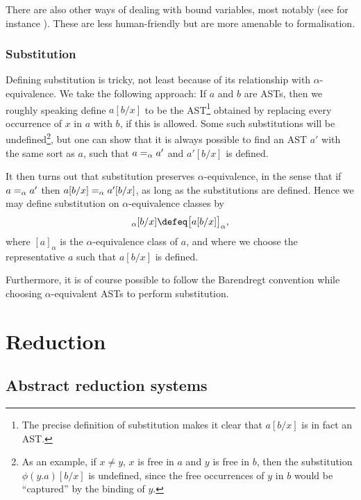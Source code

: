 There are also other ways of dealing with bound variables, most notably  (see for instance \cite[Appendix~C]{barendregt-lambda}). These are less human-friendly but are more amenable to formalisation.


\subsubsection{Substitution}

Defining substitution is tricky, not least because of its relationship with $\alpha$-equivalence. We take the following approach: If $a$ and $b$ are ASTs, then we roughly speaking define $a[b/x]$ to be the AST\footnote{The precise definition of substitution makes it clear that $a[b/x]$ is in fact an AST.} obtained by replacing every occurrence of $x$ in $a$ with $b$, if this is allowed. Some such substitutions will be undefined\footnote{As an example, if $x \neq y$, $x$ is free in $a$ and $y$ is free in $b$, then the substitution $\phi(y.a)[b/x]$ is undefined, since the free occurrences of $y$ in $b$ would be \enquote{captured} by the binding of $y$.}, but one can show that it is always possible to find an AST $a'$ with the same sort as $a$, such that $a =_\alpha a'$ and $a'[b/x]$ is defined.

It then turns out that substitution preserves $\alpha$-equivalence, in the sense that if $a =_\alpha a'$ then $a[b/x] =_\alpha a'[b/x]$, as long as the substitutions are defined. Hence we may define substitution on $\alpha$-equivalence classes by
%
\begin{equation*}
    [a]_\alpha [b/x]
        \defeq \bigl[ a[b/x] \bigr]_\alpha,
\end{equation*}
%
where $[a]_\alpha$ is the $\alpha$-equivalence class of $a$, and where we choose the representative $a$ such that $a[b/x]$ is defined.

Furthermore, it is of course possible to follow the Barendregt convention while choosing $\alpha$-equivalent ASTs to perform substitution.


\section{Reduction}

\subsection{Abstract reduction systems}

